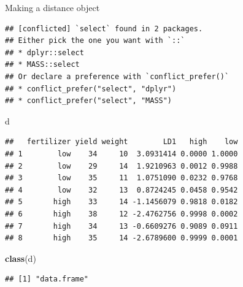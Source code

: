 \documentclass[ignorenonframetext,]{beamer}
\newenvironment{Shaded}{\begin{snugshade}}{\end{snugshade}}
\newcommand{\KeywordTok}[1]{\textcolor[rgb]{0.13,0.29,0.53}{\textbf{#1}}}
\newcommand{\NormalTok}[1]{#1}
\newcommand{\OperatorTok}[1]{\textcolor[rgb]{0.81,0.36,0.00}{\textbf{#1}}}
\newcommand{\StringTok}[1]{\textcolor[rgb]{0.31,0.60,0.02}{#1}}
\begin{document}
\begin{frame}[fragile]{Making a distance object}
\protect\hypertarget{making-a-distance-object}{}

\begin{Shaded}
\end{Shaded}

\begin{verbatim}
## [conflicted] `select` found in 2 packages.
## Either pick the one you want with `::` 
## * dplyr::select
## * MASS::select
## Or declare a preference with `conflict_prefer()`
## * conflict_prefer("select", "dplyr")
## * conflict_prefer("select", "MASS")
\end{verbatim}

\begin{Shaded}
\begin{Highlighting}[]
\NormalTok{d}
\end{Highlighting}
\end{Shaded}

\begin{verbatim}
##   fertilizer yield weight        LD1   high    low
## 1        low    34     10  3.0931414 0.0000 1.0000
## 2        low    29     14  1.9210963 0.0012 0.9988
## 3        low    35     11  1.0751090 0.0232 0.9768
## 4        low    32     13  0.8724245 0.0458 0.9542
## 5       high    33     14 -1.1456079 0.9818 0.0182
## 6       high    38     12 -2.4762756 0.9998 0.0002
## 7       high    34     13 -0.6609276 0.9089 0.0911
## 8       high    35     14 -2.6789600 0.9999 0.0001
\end{verbatim}

\begin{Shaded}
\begin{Highlighting}[]
\KeywordTok{class}\NormalTok{(d)}
\end{Highlighting}
\end{Shaded}

\begin{verbatim}
## [1] "data.frame"
\end{verbatim}

\end{frame}
\end{document}
